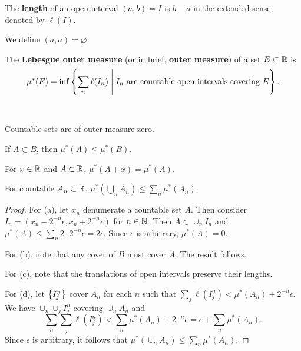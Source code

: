 \begin{definition}
    The \textbf{length} of an open interval $(a,b) = I$ is $b-a$ in the 
    extended sense, denoted by $\ell(I)$.
\end{definition}
\begin{remark}
    We define $(a,a) = \varnothing$.
\end{remark}

\begin{definition}
    The \textbf{Lebesgue outer measure} (or in brief, \textbf{outer measure}) 
    of a set $E\subset\mathbb{R}$ is 
    \begin{equation*}
        \mu^*(E) = \inf\left\{ \sum_n \ell(I_n) \;\middle\vert\; I_n\text{ are countable open intervals covering } E \right\}.
    \end{equation*}
\end{definition}

\begin{proposition}\ \vspace{-1em}
    \begin{thmenum}
        \item Countable sets are of outer measure zero.
        \item If $A\subset B$, then $\mu^*(A)\leq \mu^*(B)$.
        \item For $x\in\mathbb{R}$ and $A\subset\mathbb{R}$, $\mu^*(A+x) = \mu^*(A)$.
        \item For countable $A_n\subset\mathbb{R}$, $\mu^*(\bigcup_n A_n) \leq \sum_n \mu^*(A_n)$. 
    \end{thmenum}
\end{proposition}
\begin{proof}
    For (a), let $x_n$ denumerate a countable set $A$. Then consider 
    $I_n = (x_n-2^{-n}\epsilon, x_n+2^{-n}\epsilon)$ for $n\in\mathbb{N}$. 
    Then $A\subset \cup_n I_n$ and $\mu^*(A)\leq \sum_n 2\cdot 2^{-n}\epsilon = 2\epsilon$. 
    Since $\epsilon$ is arbitrary, $\mu^*(A) = 0$. 

    For (b), note that any cover of $B$ must cover $A$. The result follows. 

    For (c), note that the translations of open intervals preserve their lengths. 

    For (d), let $\left\{ {I_j^n} \right\}$ cover $A_n$ for each $n$ such that 
    $\sum_j \ell(I_j^n) < \mu^*(A_n) + 2^{-n}\epsilon$. We have 
    $\cup_n\cup_j I_j^n$ covering $\cup_n A_n$ and 
    \begin{equation*}
        \sum_n\sum_j \ell(I_j^n) < \sum_n \mu^*(A_n) + 2^{-n}\epsilon 
        = \epsilon + \sum_n \mu^*(A_n).
    \end{equation*}
    Since $\epsilon$ is arbitrary, it follows that $\mu^*(\cup_n A_n) \leq \sum_n \mu^*(A_n)$.
\end{proof}


